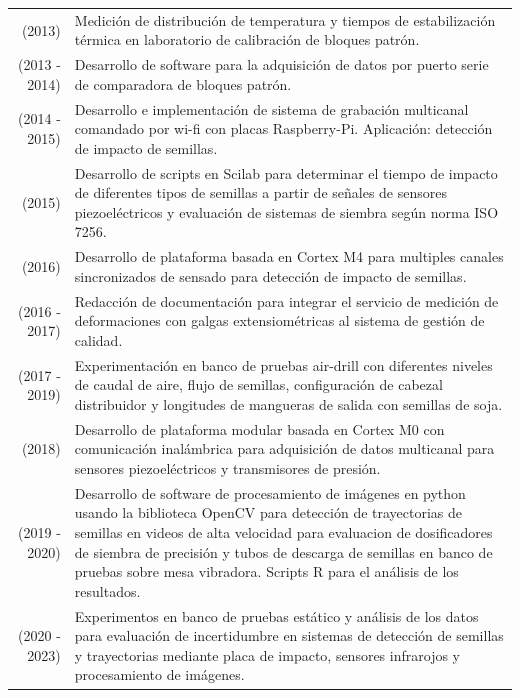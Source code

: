 \documentclass[a4paper,10pt, sans]{article}
\begin{document}
\begin{table}[h!]
\begin{tabularx}{\textwidth}{r X}
        (2013) & Medición de distribución de temperatura y tiempos de estabilización térmica en laboratorio de calibración de bloques patrón. \\ [1ex]
        (2013 - 2014) & Desarrollo de software para la adquisición de datos por puerto serie de comparadora de bloques patrón. \\ [1ex]
        (2014 - 2015) & Desarrollo e implementación de sistema de grabación multicanal comandado por wi-fi con placas Raspberry-Pi. Aplicación: detección de impacto de semillas. \\ [1ex]
        (2015) & Desarrollo de scripts en Scilab para determinar el tiempo de impacto de diferentes tipos de semillas a partir de señales de sensores piezoeléctricos y evaluación de sistemas de siembra según norma ISO 7256. \\ [1ex]
        (2016) & Desarrollo de plataforma basada en Cortex M4 para multiples canales sincronizados de sensado para detección de impacto de semillas. \\ [1ex]
        (2016 - 2017) & Redacción de documentación para integrar el servicio de medición de deformaciones con galgas extensiométricas al sistema de gestión de calidad. \\ [1ex]
        (2017 - 2019) & Experimentación en banco de pruebas air-drill con diferentes niveles de caudal de aire, flujo de semillas, configuración de cabezal distribuidor y longitudes de mangueras de salida con semillas de soja. \\ [1ex]
        (2018) & Desarrollo de plataforma modular basada en Cortex M0 con comunicación inalámbrica para adquisición de datos multicanal para sensores piezoeléctricos y transmisores de presión. \\ [1ex]
        (2019 - 2020) & Desarrollo de software de procesamiento de imágenes en python usando la biblioteca OpenCV para detección de trayectorias de semillas en videos de alta velocidad para evaluacion de dosificadores de siembra de precisión y tubos de descarga de semillas en banco de pruebas sobre mesa vibradora. Scripts R para el análisis de los resultados. \\ [1ex]
        (2020 - 2023) & Experimentos en banco de pruebas estático y análisis de los datos para evaluación de incertidumbre en sistemas de detección de semillas y trayectorias mediante placa de impacto, sensores infrarojos y procesamiento de imágenes.
       
  \end{tabularx}
  \end{table}
  
\end{document}
